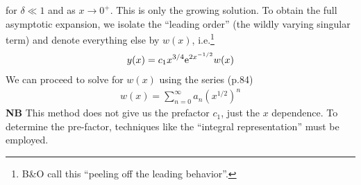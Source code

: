 for $\delta \ll 1$ and as $x \rightarrow 0^+$. This is only the growing solution. To obtain the full asymptotic expansion, we isolate the ``leading order'' (the wildly varying singular term) and denote everything else by $w(x)$, i.e.\footnote{B\&O call this ``peeling off the leading behavior''.}
\begin{gather*}
	y(x) = c_1 x^{3/4}\mathrm{e}^{2x^{-1/2}} w(x)
\end{gather*}
We can proceed to solve for $w(x)$ using the series (p.84)
\begin{gather*}
	w(x) = \sum_{n=0}^{\infty} a_n (x^{1/2})^n
\end{gather*}
{\bf NB} This method does not give us the prefactor $c_1$, just the $x$ dependence. To determine the pre-factor, techniques like the ``integral representation'' must be employed.



